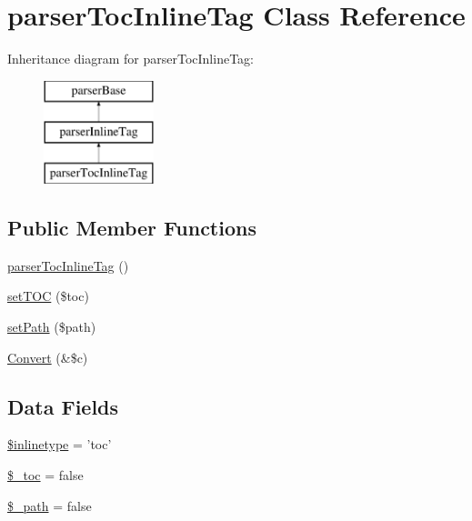 \hypertarget{classparser_toc_inline_tag}{\section{parser\-Toc\-Inline\-Tag \-Class \-Reference}
\label{classparser_toc_inline_tag}
}
\-Inheritance diagram for parser\-Toc\-Inline\-Tag\-:\begin{figure}[H]
\begin{center}
\leavevmode
\includegraphics[height=3.000000cm]{classparser_toc_inline_tag}
\end{center}
\end{figure}
\subsection*{\-Public \-Member \-Functions}
\begin{DoxyCompactItemize}
\item 
\hyperlink{classparser_toc_inline_tag_a7e34c8d7d14aaf875de878810a621a08}{parser\-Toc\-Inline\-Tag} ()
\item 
\hyperlink{classparser_toc_inline_tag_a56e6d19c20b9de8364467cfd2059de4f}{set\-T\-O\-C} (\$toc)
\item 
\hyperlink{classparser_toc_inline_tag_a5d101758b135bd36ba8992cc3bb67a24}{set\-Path} (\$path)
\item 
\hyperlink{classparser_toc_inline_tag_ad6c06bea9d11cc1c362b592306cfa707}{\-Convert} (\&\$c)
\end{DoxyCompactItemize}
\subsection*{\-Data \-Fields}
\begin{DoxyCompactItemize}
\item 
\hyperlink{classparser_toc_inline_tag_a7583c1b3912b7afa3f038eb353a6ad97}{\$inlinetype} = 'toc'
\item 
\hyperlink{classparser_toc_inline_tag_a89239c7c6ac8aca36371eeec9753c130}{\$\-\_\-toc} = false
\item 
\hyperlink{classparser_toc_inline_tag_a7827e5ae727e96269db2e008bbfb9773}{\$\-\_\-path} = false
\end{DoxyCompactItemize}


